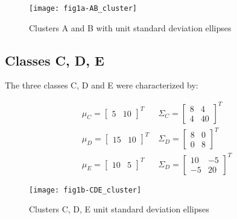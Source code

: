 \begin{figure}[ht]
\centering
	\texttt{[image: fig1a-AB\_cluster]}
	\label{fig:clustersDataAB}
	\caption{Clusters A and B with unit standard deviation ellipses}
\end{figure}

 \subsection{Classes C, D, E}
 The three classes C, D and E were characterized by:
 
 \begin{eqnarray}
{\mu}_{C}=\left[ \begin{smallmatrix} 5&10 \end{smallmatrix}\right]^{T} \; & {\Sigma}_{C}=\left[ \begin{smallmatrix} 8&4 \\ 4&40 \end{smallmatrix}\right]^{T} \nonumber\\
{\mu}_{D}=\left[ \begin{smallmatrix} 15&10 \end{smallmatrix}\right]^{T} \; & {\Sigma}_{D}=\left[ \begin{smallmatrix} 8&0 \\ 0&8 \end{smallmatrix}\right]^{T} \nonumber\\
{\mu}_{E}=\left[ \begin{smallmatrix} 10&5 \end{smallmatrix}\right]^{T} \; & {\Sigma}_{D}=\left[ \begin{smallmatrix} 10&-5 \\ -5&20 \end{smallmatrix}\right]^{T} \nonumber
\end{eqnarray}
 
 
\begin{figure}[ht]
\centering
	\texttt{[image: fig1b-CDE\_cluster]}
	\label{fig:clustersDataCDE}
	\caption{Clusters C, D, E unit standard deviation ellipses}
\end{figure}
 
\clearpage
